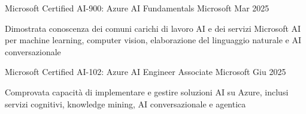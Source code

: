 \begin{cventries}
\cventry
{Microsoft Certified} %
{AI-900: Azure AI Fundamentals} %
{Microsoft} %
{Mar 2025} %
{ %
\begin{cvitems}
  \item {Dimostrata conoscenza dei comuni carichi di lavoro AI e dei servizi Microsoft AI per machine learning, computer vision, elaborazione del linguaggio naturale e AI conversazionale}
\end{cvitems}
}

\cventry
{Microsoft Certified} %
{AI-102: Azure AI Engineer Associate} %
{Microsoft} %
{Giu 2025} %
{ %
\begin{cvitems}
  \item {Comprovata capacità di implementare e gestire soluzioni AI su Azure, inclusi servizi cognitivi, knowledge mining, AI conversazionale e agentica}
\end{cvitems}
}
\fi

\end{cventries}
